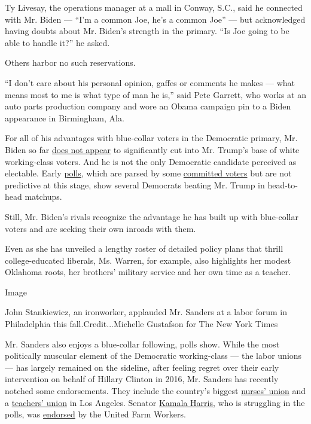 Ty Livesay, the operations manager at a mall in Conway, S.C., said he
connected with Mr. Biden --- ``I'm a common Joe, he's a common Joe'' ---
but acknowledged having doubts about Mr. Biden's strength in the
primary. ``Is Joe going to be able to handle it?'' he asked.

Others harbor no such reservations.

``I don't care about his personal opinion, gaffes or comments he makes
--- what means most to me is what type of man he is,'' said Pete
Garrett, who works at an auto parts production company and wore an Obama
campaign pin to a Biden appearance in Birmingham, Ala.

For all of his advantages with blue-collar voters in the Democratic
primary, Mr. Biden so far
\href{https://www.nytimes3xbfgragh.onion/2019/11/12/upshot/democratic-polls-battleground-states.html}{does
not appear} to significantly cut into Mr. Trump's base of white
working-class voters. And he is not the only Democratic candidate
perceived as electable. Early
\href{https://www.realclearpolitics.com/epolls/latest_polls/general_election/}{polls,}
which are parsed by some
\href{https://www.nytimes3xbfgragh.onion/2019/08/22/us/politics/joe-biden-trump-2020.html}{committed
voters} but are not predictive at this stage, show several Democrats
beating Mr. Trump in head-to-head matchups.

Still, Mr. Biden's rivals recognize the advantage he has built up with
blue-collar voters and are seeking their own inroads with them.

Even as she has unveiled a lengthy roster of detailed policy plans that
thrill college-educated liberals, Ms. Warren, for example, also
highlights her modest Oklahoma roots, her brothers' military service and
her own time as a teacher.

Image

John Stankiewicz, an ironworker, applauded Mr. Sanders at a labor forum
in Philadelphia this fall.Credit...Michelle Gustafson for The New York
Times

Mr. Sanders also enjoys a blue-collar following, polls show. While the
most politically muscular element of the Democratic working-class ---
the labor unions --- has largely remained on the sideline, after feeling
regret over their early intervention on behalf of Hillary Clinton in
2016, Mr. Sanders has recently notched some endorsements. They include
the country's biggest
\href{https://www.nytimes3xbfgragh.onion/2019/11/12/us/politics/bernie-sanders-nurses-endorsement.html}{nurses'
union} and a
\href{https://www.washingtonpost.com/education/2019/11/15/teachers-union-los-angeles-endorses-presidential-candidate-its-bernie-sanders/}{teachers'
union} in Los Angeles. Senator
\href{https://www.nytimes3xbfgragh.onion/interactive/2020/us/elections/kamala-harris.html}{Kamala
Harris}, who is struggling in the polls, was
\href{https://www.sfchronicle.com/politics/article/Exclusive-Kamala-Harris-picks-up-major-union-14839354.php}{endorsed}
by the United Farm Workers.

